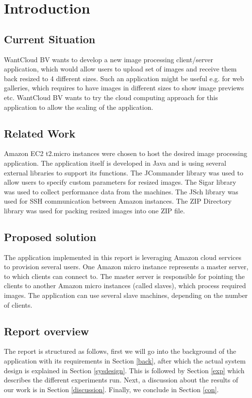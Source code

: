 \section{Introduction}
\subsection{Current Situation} 
WantCloud BV wants to develop a new image processing client/server application, which would allow users to upload set of images and receive them back resized to 4 different sizes. Such an application might be useful e.g. for web galleries, which requires to have images in different sizes to show image previews etc. WantCloud BV wants to try the cloud computing approach for this application to allow the scaling of the application.

\subsection{Related Work} 
Amazon EC2 t2.micro instances were chosen to host the desired image processing application. The application itself is developed in Java and is using several external libraries to support its functions. The JCommander library was used to allow users to specify custom parameters for resized images. The Sigar library was used to collect performance data from the machines. The JSch library was used for SSH communication between Amazon instances. The ZIP Directory library was used for packing resized images into one ZIP file.

\subsection{Proposed solution}
The application implemented in this report is leveraging Amazon cloud services to provision several users. One Amazon micro instance represents a master server, to which clients can connect to. The master server is responsible for pointing the clients to another Amazon micro instances (called slaves), which process required images. The application can use several slave machines, depending on the number of clients.

\subsection{Report overview}
The report is structured as follows, first we will go into the background of the application with its requirements in Section \ref{back}, after which the actual system design is explained in Section \ref{sysdesign}. This is followed by Section \ref{exp} which describes the different experiments run. Next, a discussion about the results of our work is in Section \ref{discussion}. Finally, we conclude in Section \ref{con}.